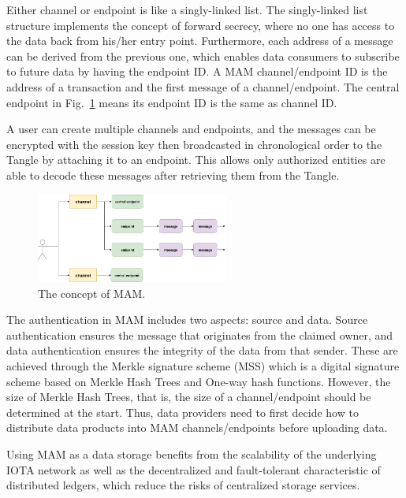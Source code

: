 \documentclass[conference]{IEEEtran}
\begin{document}
Either channel or endpoint is like a singly-linked list. The singly-linked list structure implements the concept of forward secrecy, where no one has access to the data back from his/her entry point. Furthermore, each address of a message can be derived from the previous one, which enables data consumers to subscribe to future data by having the endpoint ID. A MAM channel/endpoint ID is the address of a transaction and the first message of a channel/endpoint. The central endpoint in Fig.~\ref{fig:mam_struct} means its endpoint ID is the same as channel ID. 

A user can create multiple channels and endpoints, and the messages can be encrypted with the session key then broadcasted in chronological order to the Tangle by attaching it to an endpoint. This allows only authorized entities are able to decode these messages after retrieving them from the Tangle. 

\begin{figure}[!t]
    \centering
    \includegraphics[width=2.5in]{mam_struct}
    \caption{The concept of MAM.}
    \label{fig:mam_struct}
\end{figure}

The authentication in MAM includes two aspects: source and data. Source authentication ensures the message that originates from the claimed owner, and data authentication ensures the integrity of the data from that sender. These are achieved through the Merkle signature scheme\cite{MSS} (MSS) which is a digital signature scheme based on Merkle Hash Trees and One-way hash functions. However, the size of Merkle Hash Trees, that is, the size of a channel/endpoint should be determined at the start. Thus, data providers need to first decide how to distribute data products into MAM channels/endpoints before uploading data.

Using MAM as a data storage benefits from the scalability of the underlying IOTA network as well as the decentralized and fault-tolerant characteristic of distributed ledgers, which reduce the risks of centralized storage services. 
\end{document}
